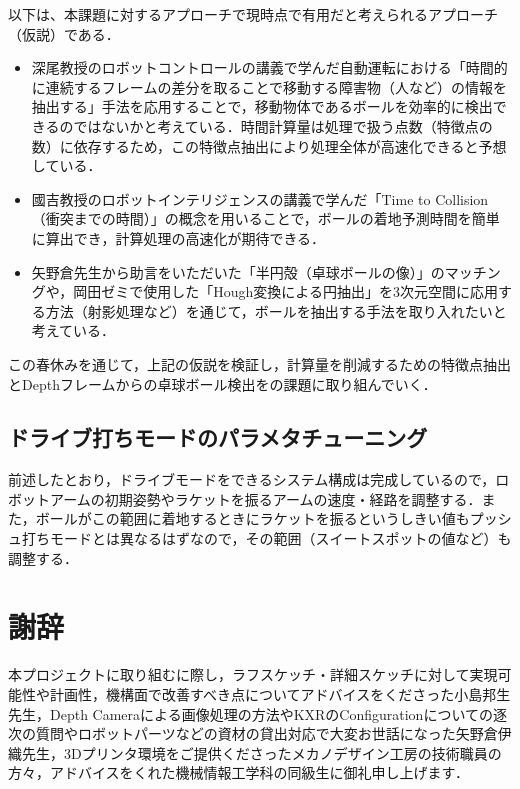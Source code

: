 \documentclass[10pt, oneside, titlepage]{ltjsarticle}  %
\begin{document}
以下は、本課題に対するアプローチで現時点で有用だと考えられるアプローチ（仮説）である．

\begin{itemize}
\item 深尾教授のロボットコントロールの講義で学んだ自動運転における「時間的に連続するフレームの差分を取ることで移動する障害物（人など）の情報を抽出する」手法を応用することで，移動物体であるボールを効率的に検出できるのではないかと考えている．時間計算量は処理で扱う点数（特徴点の数）に依存するため，この特徴点抽出により処理全体が高速化できると予想している．

\item 國吉教授のロボットインテリジェンスの講義で学んだ「Time to Collision（衝突までの時間）」の概念を用いることで，ボールの着地予測時間を簡単に算出でき，計算処理の高速化が期待できる．

\item 矢野倉先生から助言をいただいた「半円殻（卓球ボールの像）」のマッチングや，岡田ゼミで使用した「Hough変換による円抽出」を3次元空間に応用する方法（射影処理など）を通じて，ボールを抽出する手法を取り入れたいと考えている．
\end{itemize}

この春休みを通じて，上記の仮説を検証し，計算量を削減するための特徴点抽出とDepthフレームからの卓球ボール検出をの課題に取り組んでいく．



\subsection{ドライブ打ちモードのパラメタチューニング}
前述したとおり，ドライブモードをできるシステム構成は完成しているので，ロボットアームの初期姿勢やラケットを振るアームの速度・経路を調整する．また，ボールがこの範囲に着地するときにラケットを振るというしきい値もプッシュ打ちモードとは異なるはずなので，その範囲（スイートスポットの値など）も調整する．

\section{謝辞}
本プロジェクトに取り組むに際し，ラフスケッチ・詳細スケッチに対して実現可能性や計画性，機構面で改善すべき点についてアドバイスをくださった小島邦生先生，Depth Cameraによる画像処理の方法やKXRのConfigurationについての逐次の質問やロボットパーツなどの資材の貸出対応で大変お世話になった矢野倉伊織先生，3Dプリンタ環境をご提供くださったメカノデザイン工房の技術職員の方々，アドバイスをくれた機械情報工学科の同級生に御礼申し上げます．
\end{document}
